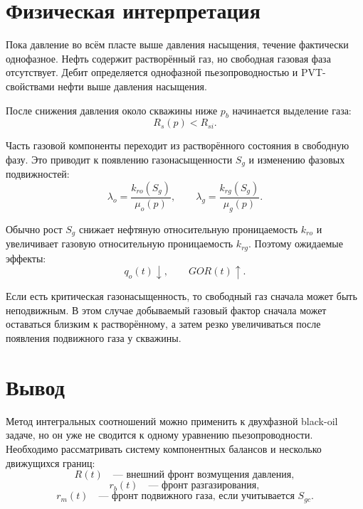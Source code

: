 \documentclass[12pt,a4paper]{article}
\begin{document}
\section{Физическая интерпретация}

Пока давление во всём пласте выше давления насыщения, течение фактически однофазное. Нефть содержит растворённый газ, но свободная газовая фаза отсутствует. Дебит определяется однофазной пьезопроводностью и PVT-свойствами нефти выше давления насыщения.

После снижения давления около скважины ниже $p_b$ начинается выделение газа:
\begin{equation}
    R_s(p) < R_{si}.
\end{equation}

Часть газовой компоненты переходит из растворённого состояния в свободную фазу. Это приводит к появлению газонасыщенности $S_g$ и изменению фазовых подвижностей:
\begin{equation}
    \lambda_o = \frac{k_{ro}(S_g)}{\mu_o(p)},
    \qquad
    \lambda_g = \frac{k_{rg}(S_g)}{\mu_g(p)}.
\end{equation}

Обычно рост $S_g$ снижает нефтяную относительную проницаемость $k_{ro}$ и увеличивает газовую относительную проницаемость $k_{rg}$. Поэтому ожидаемые эффекты:
\begin{equation}
    q_o(t) \downarrow,
    \qquad
    GOR(t) \uparrow.
\end{equation}

Если есть критическая газонасыщенность, то свободный газ сначала может быть неподвижным. В этом случае добываемый газовый фактор сначала может оставаться близким к растворённому, а затем резко увеличиваться после появления подвижного газа у скважины.

\section{Вывод}

Метод интегральных соотношений можно применить к двухфазной black-oil задаче, но он уже не сводится к одному уравнению пьезопроводности. Необходимо рассматривать систему компонентных балансов и несколько движущихся границ:
\begin{equation}
    R(t) \quad \text{--- внешний фронт возмущения давления},
\end{equation}
\begin{equation}
    r_b(t) \quad \text{--- фронт разгазирования},
\end{equation}
\begin{equation}
    r_m(t) \quad \text{--- фронт подвижного газа, если учитывается } S_{gc}.
\end{equation}
\end{document}
